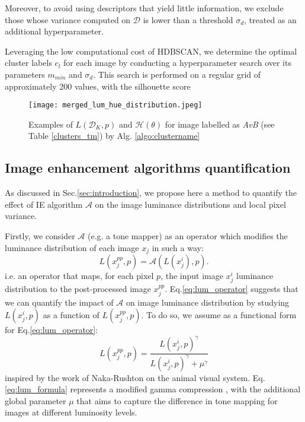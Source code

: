\documentclass[12pt]{spieman}  %
\begin{document}
\begin{spacing}{2}
\begin{linenumbers}
 {Moreover, to avoid using descriptors that yield little information, we exclude those whose variance computed on $\mathcal{D}$ is lower than a threshold $\sigma_d$, treated as an additional hyperparameter.} 




 {Leveraging the low computational cost of HDBSCAN, we determine the optimal cluster labels $c_l$ for each image by conducting a hyperparameter search over its parameters $m_{min}$ and $\sigma_d$. This search is performed on a regular grid of approximately 200 values, with the silhouette score}  \cite{ROUSSEEUW198753}







\begin{figure*}[!t]
	\centering
	\texttt{[image: merged\_lum\_hue\_distribution.jpeg]}
	\caption{Examples of $L(\mathcal{D}_K,p)$ and $\mathcal{H}(\theta)$ for image labelled as \textit{AvB} (see Table \ref{clusters_tm}) by Alg. \ref{algo:clustername}}   
	\label{fig:lum_group_hue_distribution}
\end{figure*}


\subsection{Image enhancement algorithms quantification}
\label{subsection:quantify_algo}




As discussed in Sec.\ref{sec:introduction}, we  propose here a method to quantify the effect of IE algorithm $\mathcal{A}$ on the image luminance distributions and local pixel variance.

Firstly, we consider $\mathcal{A}$ (e.g. a tone mapper) as an operator which  modifies the luminance distribution of each image $x_j$ in such a way:
\begin{equation}
	L(x^{pp}_j, p) = \mathcal{A}(L(x^{i}_j), p).
	\label{eq:lum_operator}
\end{equation}
i.e. an operator that maps, for each pixel $p$, the input image $x^{i}_j$ luminance distribution to the post-processed image $x^{pp}_j$. Eq.\ref{eq:lum_operator} suggests that we can quantify the impact of $\mathcal{A}$ on image luminance distribution by studying $L(x^{i}_j, p)$ as a function of $L(x^{pp}_j, p)$. To do so, we assume  as a functional form for Eq.\ref{eq:lum_operator}:
\begin{equation}
	L(x^{pp}_j, p) = \frac{L(x^{i}_j, p)^{\gamma}}{L(x^{i}_j, p)^{\gamma} + \mu^{\gamma}}
	\label{eq:lum_formula}
\end{equation}
inspired by the work of Naka-Rushton \cite{Naka1966} on the animal visual system. Eq.\ref{eq:lum_formula} represents a modified gamma compression \cite{Poynton2003}, with the additional global parameter $\mu$  that aims to capture the difference in tone mapping for images at different luminosity levels. 



\end{linenumbers}
\end{spacing}
\end{document}
